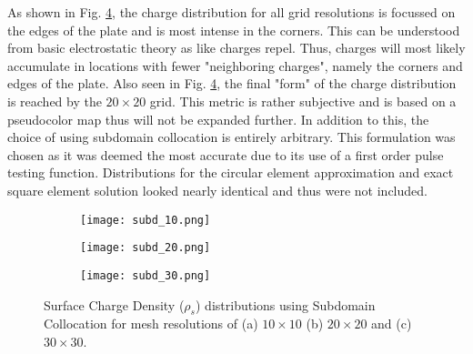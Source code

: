 As shown in Fig. \ref{fig:charge_d}, the charge distribution for all grid resolutions is focussed on the edges of the plate and is most intense in the corners. This can be understood from basic electrostatic theory as like charges repel. Thus, charges will most likely accumulate in locations with fewer "neighboring charges", namely the corners and edges of the plate. Also seen in Fig. \ref{fig:charge_d}, the final "form" of the charge distribution is reached by the $20\times 20$ grid. This metric is rather subjective and is based on a pseudocolor map thus will not be expanded further. In addition to this, the choice of using subdomain collocation is entirely arbitrary. This formulation was chosen as it was deemed the most accurate due to its use of a first order pulse testing function. Distributions for the circular element approximation and exact square element solution looked nearly identical and thus were not included.

\begin{figure}[t!]
	\begin{subfigure}{\linewidth} %
		\centering
		\texttt{[image: subd\_10.png]} %
		\caption{}
		\label{subfig:d10}
	\end{subfigure}
	\begin{subfigure}{\linewidth}
		\centering
		\texttt{[image: subd\_20.png]} %
		\caption{} %
		\label{subfig:d20}
	\end{subfigure}
	\begin{subfigure}{\linewidth}
		\centering
		\texttt{[image: subd\_30.png]} %
		\caption{} %
		\label{subfig:d30}
	\end{subfigure}
	\caption{Surface Charge Density ($\rho_s$) distributions using Subdomain Collocation for mesh resolutions of (a) $10\times10$ (b) $20\times20$ and (c) $30\times30$.}
	\label{fig:charge_d}
\end{figure}


